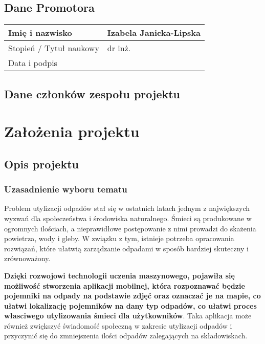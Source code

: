 \documentclass[12pt,oneside]{book}
\begin{document}
\section{Dane Promotora}

\begin{tabular}{ |p{5cm}|p{9cm}|}
    \hline
    Imię i nazwisko & Izabela Janicka-Lipska \\
    \hline
    Stopień / Tytuł naukowy & dr inż. \\
    \hline
    Data i podpis &  \\ \hline
\end{tabular}


\pagestyle{plain}

\section{Dane członków zespołu projektu}

\membersTable

{\let\clearpage\relax
    \chapter{Założenia projektu}
    }

\section{Opis projektu}

\subsection{Uzasadnienie wyboru tematu}

Problem utylizacji odpadów stał się w ostatnich latach jednym z największych wyzwań dla społeczeństwa i środowiska naturalnego. Śmieci są produkowane w ogromnych ilościach, a nieprawidłowe postępowanie z nimi prowadzi do skażenia powietrza, wody i gleby. W związku z tym, istnieje potrzeba opracowania rozwiązań, które ułatwią zarządzanie odpadami w sposób bardziej skuteczny i zrównoważony.

\textbf{Dzięki rozwojowi technologii uczenia maszynowego, pojawiła się możliwość stworzenia aplikacji mobilnej, która rozpoznawać będzie pojemniki na odpady na podstawie zdjęć oraz oznaczać je na mapie, co ułatwi lokalizację pojemników na dany typ odpadów, co ułatwi proces własciwego utylizowania śmieci dla użytkowników}. Taka aplikacja może również zwiększyć świadomość społeczną w zakresie utylizacji odpadów i przyczynić się do zmniejszenia ilości odpadów zalegających na składowiskach.
\end{document}
